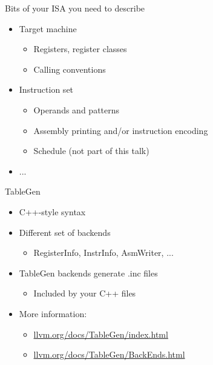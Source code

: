 
\begin{frame}{Bits of your ISA you need to describe}

\begin{itemize}
    \item Target machine
    \begin{itemize}
        \item Registers, register classes
        \item Calling conventions
    \end{itemize}
    \item Instruction set
    \begin{itemize}
        \item Operands and patterns
        \item Assembly printing and/or instruction encoding
        \item Schedule (not part of this talk)
    \end{itemize}
    \item ...
\end{itemize}

\end{frame}


\begin{frame}{TableGen}

\begin{itemize}
    \item C++-style syntax
    \item Different set of backends
    \begin{itemize}
        \item RegisterInfo, InstrInfo, AsmWriter, ...
    \end{itemize}
    \item TableGen backends generate .inc files
    \begin{itemize}
        \item Included by your C++ files
    \end{itemize}
    \item More information:
    \begin{itemize}
        \item \url{llvm.org/docs/TableGen/index.html}
        \item \url{llvm.org/docs/TableGen/BackEnds.html}
    \end{itemize}
\end{itemize}

\end{frame}

